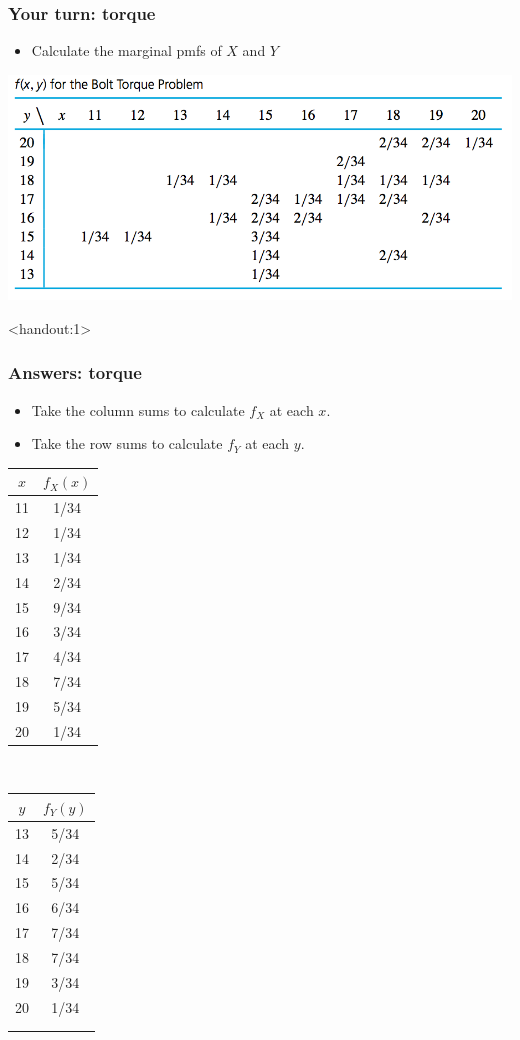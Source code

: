 \documentclass[handout]{beamer}\usepackage[]{graphicx}\usepackage[]{color}
\newcommand{\answers}{1}
\numberwithin{equation}{section}
\begin{document}
\begin{frame}
\frametitle{Your turn: torque}
\begin{itemize}
\item Calculate the marginal pmfs of $X$ and $Y$
\end{itemize}
 \includegraphics{../../fig/torquetable.png}
\end{frame}

\begin{frame}<handout:\answers>
\frametitle{Answers: torque}
\begin{itemize}
\pause \item Take the column sums to calculate $f_X$ at each $x$.
\pause \item Take the row sums to calculate $f_Y$ at each $y$. 
\end{itemize}
\begin{center}
\pause \begin{tabular}{cc}
$x$ & $f_X(x)$  \\ \hline
11 & 1/34 \\ 
12 & 1/34 \\ 
13 & 1/34 \\ 
14 & 2/34 \\ 
15 & 9/34 \\ 
16 & 3/34 \\ 
17 & 4/34 \\ 
18 & 7/34 \\ 
19 & 5/34 \\ 
20 & 1/34 \\ 
\end{tabular} $\quad$ \begin{tabular}{cc}
$y$ & $f_Y(y)$ \\ \hline
13 & 5/34 \\ 
14 & 2/34 \\ 
15 & 5/34 \\ 
16 & 6/34 \\ 
17 & 7/34 \\ 
18 & 7/34 \\ 
19 & 3/34 \\ 
20 & 1/34 \\ 
{ } & { } \\
{} & {} \\
\end{tabular}
\end{center}
\end{frame}
\end{document}
